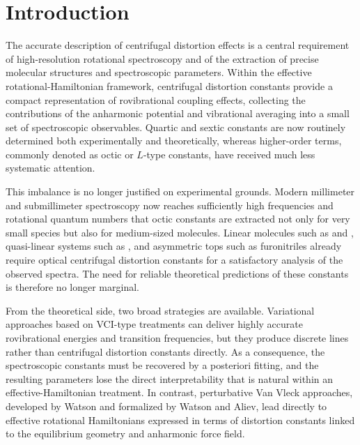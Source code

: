 \documentclass[aip,jcp,reprint,floatfix]{revtex4-2}
\begin{document}
\begin{abstract}
The source structure of the effective octic Hamiltonian is analyzed directly
from Eq.~(99) of Watson--Aliev. Under the same structural assumptions already
established for the standard sextic sector, the final optical Hamiltonian is
shown to be \(\mu_2\)-free, so that optical centrifugal distortion constants
belong to the same linear tensor-transport regime as the standard quartic and
sextic constants. The optical branch therefore provides a clean entry point for
a representation-independent treatment of high-order centrifugal distortion in
both linear and non-linear molecules.
\end{abstract}

\maketitle

\section{Introduction}

The accurate description of centrifugal distortion effects is a central
requirement of high-resolution rotational spectroscopy and of the extraction
of precise molecular structures and spectroscopic parameters. Within the
effective rotational-Hamiltonian framework, centrifugal distortion constants
provide a compact representation of rovibrational coupling effects, collecting
the contributions of the anharmonic potential and vibrational averaging into a
small set of spectroscopic observables. Quartic and sextic constants are now
routinely determined both experimentally and theoretically, whereas higher-order
terms, commonly denoted as octic or \(L\)-type constants, have received much
less systematic attention.

This imbalance is no longer justified on experimental grounds. Modern
millimeter and submillimeter spectroscopy now reaches sufficiently high
frequencies and rotational quantum numbers that octic constants are extracted
not only for very small species but also for medium-sized molecules. Linear
molecules such as  and , quasi-linear systems such as
, and asymmetric tops such as furonitriles already require optical
centrifugal distortion constants for a satisfactory analysis of the observed
spectra. The need for reliable theoretical predictions of these constants is
therefore no longer marginal.

From the theoretical side, two broad strategies are available. Variational
approaches based on VCI-type treatments can deliver highly accurate
rovibrational energies and transition frequencies, but they produce discrete
lines rather than centrifugal distortion constants directly. As a consequence,
the spectroscopic constants must be recovered by a posteriori fitting, and the
resulting parameters lose the direct interpretability that is natural within an
effective-Hamiltonian treatment. In contrast, perturbative Van Vleck
approaches, developed by Watson and formalized by Watson and Aliev, lead
directly to effective rotational Hamiltonians expressed in terms of distortion
constants linked to the equilibrium geometry and anharmonic force field.
\end{document}
